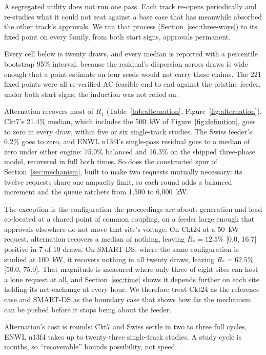 \documentclass[review,authoryear,12pt]{elsarticle}
\begin{document}
A segregated utility does not run one pass. Each track re-opens periodically
and re-studies what it could not seat against a base case that has meanwhile
absorbed the other track's approvals. We ran that process
(Section~\ref{sec:three-ways}) to its fixed point on every family, from both
start signs, approvals permanent.

Every cell below is twenty draws, and every median is reported with a
percentile bootstrap 95\% interval, because the residual's dispersion across
draws is wide enough that a point estimate on four seeds would not carry these
claims. The 221 fixed points were all re-verified AC-feasible end to end
against the pristine feeder, under both start signs; the induction was not
relied on.

Alternation recovers most of $R_{1}$ (Table~\ref{tab:alternation},
Figure~\ref{fig:alternation}). Ckt7's 21.4\% median, which includes the 500~kW
of Figure~\ref{fig:definition}, goes to zero in every draw, within five or six
single-track studies. The Swiss feeder's 6.2\% goes to zero, and ENWL n13f4's
single-pass residual goes to a median of zero under either engine: 75.0\%
balanced and 16.3\% on the shipped three-phase model, recovered in full both
times. So does the constructed spur of
Section~\ref{sec:mechanism}, built to make two requests mutually necessary: its
twelve requests share one ampacity limit, so each round adds a balanced
increment and the queue ratchets from 1{,}500 to 6{,}000~kW.

The exception is the configuration the proceedings are about: generation and
load co-located at a shared point of common coupling, on a feeder large enough
that approvals elsewhere do not move that site's voltage. On Ckt24 at a 50~kW
request, alternation recovers a median of nothing, leaving
$R_{\ast} = 12.5\%$ [0.0, 16.7] positive in 7 of 10 draws. On SMART-DS, where
the same configuration is studied at 100~kW, it recovers nothing in all twenty
draws, leaving $R_{\ast} = 62.5\%$ [50.0, 75.0]. That magnitude is measured
where only three of eight sites can host a lone request at all, and
Section~\ref{sec:time} shows it depends further on each site holding its net
exchange at every hour. We therefore treat Ckt24 as the reference case and
SMART-DS as the boundary case that shows how far the mechanism can be pushed
before it stops being about the feeder.

Alternation's cost is rounds: Ckt7 and Swiss settle in two to three full
cycles, ENWL n13f4 takes up to twenty-three single-track studies. A study cycle
is months, so ``recoverable'' bounds possibility, not speed.
\end{document}
